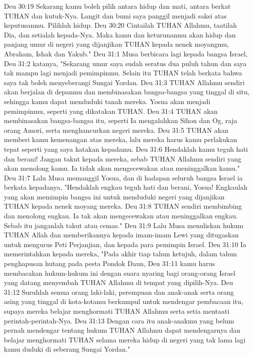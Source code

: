 Deu 30:19  Sekarang kamu boleh pilih antara hidup dan mati, antara berkat TUHAN dan kutuk-Nya. Langit dan bumi saya panggil menjadi saksi atas keputusanmu. Pilihlah hidup.
Deu 30:20  Cintailah TUHAN Allahmu, taatilah Dia, dan setialah kepada-Nya. Maka kamu dan keturunanmu akan hidup dan panjang umur di negeri yang dijanjikan TUHAN kepada nenek moyangmu, Abraham, Ishak dan Yakub."
Deu 31:1  Musa berbicara lagi kepada bangsa Israel,
Deu 31:2  katanya, "Sekarang umur saya sudah seratus dua puluh tahun dan saya tak mampu lagi menjadi pemimpinmu. Selain itu TUHAN telah berkata bahwa saya tak boleh menyeberangi Sungai Yordan.
Deu 31:3  TUHAN Allahmu sendiri akan berjalan di depanmu dan membinasakan bangsa-bangsa yang tinggal di situ, sehingga kamu dapat menduduki tanah mereka. Yosua akan menjadi pemimpinmu, seperti yang dikatakan TUHAN.
Deu 31:4  TUHAN akan membinasakan bangsa-bangsa itu, seperti Ia mengalahkan Sihon dan Og, raja orang Amori, serta menghancurkan negeri mereka.
Deu 31:5  TUHAN akan memberi kamu kemenangan atas mereka, lalu mereka harus kamu perlakukan tepat seperti yang saya katakan kepadamu.
Deu 31:6  Hendaklah kamu teguh hati dan berani! Jangan takut kepada mereka, sebab TUHAN Allahmu sendiri yang akan menolong kamu. Ia tidak akan mengecewakan atau meninggalkan kamu."
Deu 31:7  Lalu Musa memanggil Yosua, dan di hadapan seluruh bangsa Israel ia berkata kepadanya, "Hendaklah engkau teguh hati dan berani, Yosua! Engkaulah yang akan memimpin bangsa ini untuk menduduki negeri yang dijanjikan TUHAN kepada nenek moyang mereka.
Deu 31:8  TUHAN sendiri membimbing dan menolong engkau. Ia tak akan mengecewakan atau meninggalkan engkau. Sebab itu janganlah takut atau cemas."
Deu 31:9  Lalu Musa menuliskan hukum TUHAN Allah dan memberikannya kepada imam-imam Lewi yang ditugaskan untuk mengurus Peti Perjanjian, dan kepada para pemimpin Israel.
Deu 31:10  Ia memerintahkan kepada mereka, "Pada akhir tiap tahun ketujuh, dalam tahun penghapusan hutang pada pesta Pondok Daun,
Deu 31:11  kamu harus membacakan hukum-hukum ini dengan suara nyaring bagi orang-orang Israel yang datang menyembah TUHAN Allahmu di tempat yang dipilih-Nya.
Deu 31:12  Suruhlah semua orang laki-laki, perempuan dan anak-anak serta orang asing yang tinggal di kota-kotamu berkumpul untuk mendengar pembacaan itu, supaya mereka belajar menghormati TUHAN Allahmu serta setia mentaati perintah-perintah-Nya.
Deu 31:13  Dengan cara itu anak-anakmu yang belum pernah mendengar tentang hukum TUHAN Allahmu dapat mendengarnya dan belajar menghormati TUHAN selama mereka hidup di negeri yang tak lama lagi kamu duduki di seberang Sungai Yordan."
